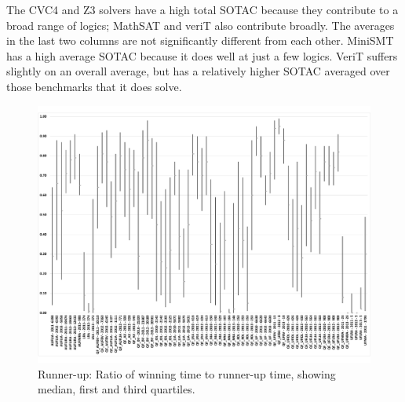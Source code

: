 \documentclass[smallcondensed]{svjour3}
\begin{document}
\begin{itemize}
The CVC4 and Z3 solvers have a high total SOTAC because they contribute to a broad range of logics; MathSAT and veriT also contribute broadly. The averages in the last two columns are not significantly different from each other. MiniSMT has a high average SOTAC because it does well at just a few logics. VeriT suffers slightly on an overall average, but has a relatively higher SOTAC averaged over those benchmarks that it does solve.

\end{itemize}

%
%
%

\begin{figure}
\centering
\includegraphics[angle=270,origin=c,width=\columnwidth,height=.83\textheight]{runnerup.pdf}
\caption{Runner-up: Ratio of winning time to runner-up time, showing median, first and third quartiles.}
\label{Fig:runnerup1}
\end{figure}
\end{document}

